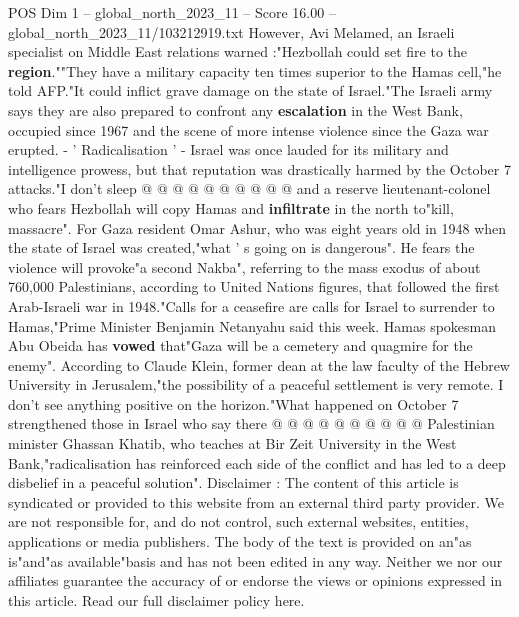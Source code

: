 \begin{textsample}{POS Dim 1 – global\_north\_2023\_11 – Score 16.00 – global\_north\_2023\_11/103212919.txt}
However, Avi Melamed, an Israeli specialist on Middle East relations warned :"Hezbollah could set fire to the \textbf{region}.""They have a military capacity ten times superior to the Hamas cell,"he told AFP."It could inflict grave damage on the state of Israel."The Israeli army says they are also prepared to confront any \textbf{escalation} in the West Bank, occupied since 1967 and the scene of more intense violence since the Gaza war erupted. - ' Radicalisation ' - Israel was once lauded for its military and intelligence prowess, but that reputation was drastically harmed by the October 7 attacks."I don't sleep @ @ @ @ @ @ @ @ @ @ and a reserve lieutenant-colonel who fears Hezbollah will copy Hamas and \textbf{infiltrate} in the north to"kill, massacre".
For Gaza resident Omar Ashur, who was eight years old in 1948 when the state of Israel was created,"what ' s going on is dangerous".
He fears the violence will provoke"a second Nakba", referring to the mass exodus of about 760,000 Palestinians, according to United Nations figures, that followed the first Arab-Israeli war in 1948."Calls for a ceasefire are calls for Israel to surrender to Hamas,"Prime Minister Benjamin Netanyahu said this week.
Hamas spokesman Abu Obeida has \textbf{vowed} that"Gaza will be a cemetery and quagmire for the enemy".
According to Claude Klein, former dean at the law faculty of the Hebrew University in Jerusalem,"the possibility of a peaceful settlement is very remote.
I don't see anything positive on the horizon."What happened on October 7 strengthened those in Israel who say there @ @ @ @ @ @ @ @ @ @ Palestinian minister Ghassan Khatib, who teaches at Bir Zeit University in the West Bank,"radicalisation has reinforced each side of the conflict and has led to a deep disbelief in a peaceful solution".
Disclaimer : The content of this article is syndicated or provided to this website from an external third party provider.
We are not responsible for, and do not control, such external websites, entities, applications or media publishers.
The body of the text is provided on an"as is"and"as available"basis and has not been edited in any way.
Neither we nor our affiliates guarantee the accuracy of or endorse the views or opinions expressed in this article.
Read our full disclaimer policy here.

\end{textsample}
